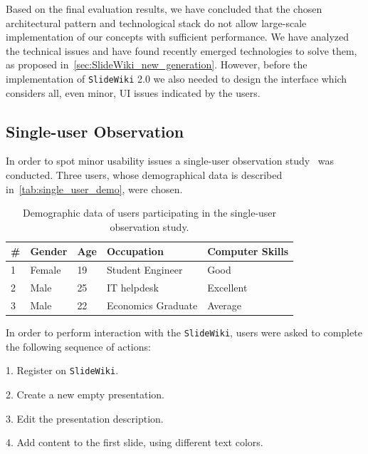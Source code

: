 \documentclass[PhD, Submit, ngerman,UKenglish,table]{scrbook}
\begin{document}
Based on the final evaluation results, we have concluded that the chosen architectural pattern and technological stack do not allow large-scale implementation of our concepts with sufficient performance.
We have analyzed the technical issues and have found  recently emerged technologies to solve them, as proposed in~\autoref{sec:SlideWiki_new_generation}.
However, before the implementation of \texttt{SlideWiki} 2.0 we also needed to design the interface which considers all, even minor, UI issues indicated by the users.

\subsection{Single-user Observation}
In order to spot minor usability issues a single-user observation study~\cite{hasanov2015measuring} was conducted.
Three users, whose demographical data is described in~\autoref{tab:single_user_demo}, were chosen.

\begin{table}[!h]
\centering

\begin{tabularx}{0.7\columnwidth}{l l l l l }    
    \toprule
    
    \textbf{\#} &\textbf{Gender} & \textbf{Age} & \textbf{Occupation} & \textbf{Computer Skills}\\
    \midrule
    
   1 & Female & 19 & Student Engineer & Good \\
	\midrule
	
    2 &  Male & 25 & IT helpdesk & Excellent \\
    \midrule
   
    3 &  Male & 22 & Economics Graduate & Average\\
    
	\bottomrule
    \end{tabularx}
\caption{Demographic data of users participating in the single-user observation study.}
\label{tab:single_user_demo}
\end{table}

In order to perform interaction with the \texttt{SlideWiki}, users were asked to complete the following sequence of actions:


1. Register on \texttt{SlideWiki}.

2. Create a new empty presentation.

3. Edit the presentation description.

4. Add content to the first slide, using different text colors.
\end{document}
